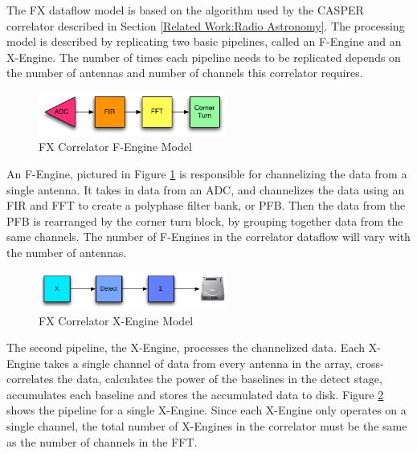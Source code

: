 The FX dataflow model is based on the algorithm used by the CASPER correlator described in Section \ref{Related Work:Radio Astronomy}. The processing model is described by replicating two basic pipelines, called an F-Engine and an X-Engine. The number of times each pipeline needs to be replicated depends on the number of antennas and number of channels this correlator requires.

\begin{figure}[h!]
  \centering
    \includegraphics[width=0.55\textwidth]{Images/C4/fx_f_engine.pdf}
  \caption{FX Correlator F-Engine Model}
  \label{fig: C4/fx_f_engine.pdf}
\end{figure}

An F-Engine, pictured in Figure \ref{fig: C4/fx_f_engine.pdf} is responsible for channelizing the data from a single antenna. 
It takes in data from an ADC, and channelizes the data using an FIR and FFT to create a polyphase filter bank, or PFB. 
Then the data from the PFB is rearranged by the corner turn block, by grouping together data from the same channels.
The number of F-Engines in the correlator dataflow will vary with the number of antennas.

\begin{figure}[h!]
  \centering
    \includegraphics[width=0.55\textwidth]{Images/C4/fx_x_engine.pdf}
  \caption{FX Correlator X-Engine Model}
  \label{fig: C4/fx_x_engine.pdf}
\end{figure}

The second pipeline, the X-Engine, processes the channelized data. 
Each X-Engine takes a single channel of data from every antenna in the array, cross-correlates the data, calculates the power of the baselines in the detect stage, accumulates each baseline and stores the accumulated data to disk. 
Figure \ref{fig: C4/fx_x_engine.pdf} shows the pipeline for a single X-Engine. 
Since each X-Engine only operates on a single channel, the total number of X-Engines in the correlator must be the same as the number of channels in the FFT.


